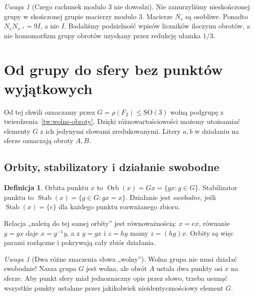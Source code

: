 \documentclass[11pt,a4paper]{article}
\numberwithin{equation}{section}
\theoremstyle{plain}
\theoremstyle{definition}
\newtheorem{definicja}[twierdzenie]{Definicja}
\theoremstyle{remark}
\newtheorem{uwaga}[twierdzenie]{Uwaga}
\newcommand{\Orb}{\operatorname{Orb}}
\newcommand{\Stab}{\operatorname{Stab}}
\begin{document}
\begin{uwaga}[Czego rachunek modulo 3 nie dowodzi]
Nie zanurzyliśmy nieskończonej grupy w skończonej grupie macierzy modulo $3$. Macierze $\overline{N_s}$ są osobliwe. Ponadto $N_sN_{s^{-1}}=9I$, a nie $I$. Badaliśmy podzielność wpisów liczników iloczynu obrotów, a nie homomorfizm grupy obrotów uzyskany przez redukcję ułamka $1/3$.
\end{uwaga}

\section{Od grupy do sfery bez punktów wyjątkowych}
Od tej chwili oznaczamy przez $G=\rho(F_2)\le\mathrm{SO}(3)$ wolną podgrupę z twierdzenia~\ref{tw:wolne-obroty}. Dzięki różnowartościowości możemy utożsamiać elementy $G$ z ich jedynymi słowami zredukowanymi. Litery $a,b$ w działaniu na sferze oznaczają obroty $A,B$.

\subsection{Orbity, stabilizatory i działanie swobodne}
\begin{definicja}
Orbita punktu $x$ to $\Orb(x)=Gx=\{gx:g\in G\}$. Stabilizator punktu to $\Stab(x)=\{g\in G:gx=x\}$. Działanie jest \emph{swobodne}, jeśli $\Stab(x)=\{e\}$ dla każdego punktu rozważanego zbioru.
\end{definicja}
Relacja „należą do tej samej orbity” jest równoważnością: $x=ex$, równanie $y=gx$ daje $x=g^{-1}y$, a z $y=gx$ i $z=hy$ mamy $z=(hg)x$. Orbity są więc parami rozłączne i pokrywają cały zbiór działania.
\begin{uwaga}[Dwa różne znaczenia słowa „wolny”]
Wolna grupa nie musi działać swobodnie! Nasza grupa $G$ jest wolna, ale obrót $A$ ustala dwa punkty osi $x$ na sferze. Aby punkt sfery miał jednoznaczny opis przez słowo, trzeba usunąć wszystkie punkty ustalane przez jakikolwiek nieidentycznościowy element $G$.
\end{uwaga}
\end{document}
